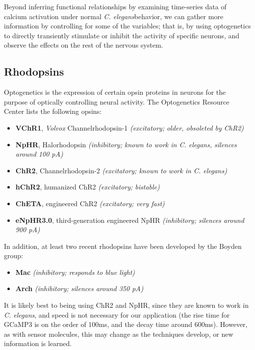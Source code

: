 \documentclass[letter,11pt]{article}
\newcommand{\cel}{{\em C. elegans}}
\begin{document}

Beyond inferring functional relationships by examining time-series data of calcium activation
under normal \cel behavior, we can gather more information by controlling for some of the
variables; that is, by using optogenetics to directly transiently stimulate or inhibit the
activity of specific neurons, and observe the effects on the rest of the nervous system.

\subsection{Rhodopsins}

Optogenetics is the expression of certain opsin proteins in neurons for the purpose of optically
controlling neural activity. The Optogenetics Resource Center lists the following opsins:
\begin{itemize}
  \item \textbf{VChR1}, {\em Volvox} Channelrhodopsin-1 {\em (excitatory; older, obsoleted by ChR2)}
  \item \textbf{NpHR}, Halorhodopsin {\em (inhibitory; known to work in \cel, silences around 100 pA)}
  \item \textbf{ChR2}, Channelrhodopsin-2 {\em (excitatory; known to work in \cel)}
  \item \textbf{hChR2}, humanized ChR2 {\em (excitatory; bistable)}
  \item \textbf{ChETA}, engineered ChR2 {\em (excitatory; very fast)}
  \item \textbf{eNpHR3.0}, third-generation engineered NpHR {\em (inhibitory; silences around 900 pA)}
\end{itemize}
In addition, at least two recent rhodopsins have been developed by the Boyden group:
\begin{itemize}
  \item \textbf{Mac} {\em (inhibitory; responds to blue light)}
  \item \textbf{Arch} {\em (inhibitory; silences around 350 pA)}
\end{itemize}

It is likely best to being using ChR2 and NpHR, since they are known to work in \cel , and speed
is not necessary for our application (the rise time for GCaMP3 is on the order of 100ms, and the
decay time around 600ms). However, as with sensor molecules, this may change as the techniques
develop, or new information is learned.
\end{document}
